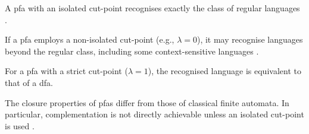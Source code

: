\begin{theorem}
    \label{thm:rabin}
    A \gls{pfa} with an isolated cut-point recognises exactly the class of regular languages \cite{rabin1963probabilistic}.
\end{theorem}

\begin{proposition}
    If a \gls{pfa} employs a non-isolated cut-point (e.g., \(\lambda = 0\)), it may recognise languages beyond the regular class, including some context-sensitive languages \cite{paz1971introduction}.
\end{proposition}

\begin{corollary}
For a \gls{pfa} with a strict cut-point (\(\lambda = 1\)), the recognised language is equivalent to that of a \gls{dfa}.
\end{corollary}

\begin{observation}
    The closure properties of \glspl{pfa} differ from those of classical finite automata. In particular, complementation is not directly achievable unless an isolated cut-point is used \cite{droste2009handbook}.
\end{observation}
